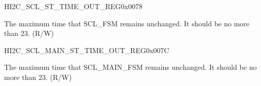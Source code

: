 \begin{register}{H}{I2C\_SCL\_ST\_TIME\_OUT\_REG}{0x0078}\label{regdesc:I2CSCLSTTIMEOUTREG}
%
%
\regnewline%
\begin{regdesc}\begin{reglist}
\label{fielddesc:I2CSCLSTTOI2C}\item [I2C\_SCL\_ST\_TO\_I2C] The maximum time that SCL\_FSM remains unchanged. It should be no more than 23. (R/W)
\end{reglist}\end{regdesc}
\end{register}


\begin{register}{H}{I2C\_SCL\_MAIN\_ST\_TIME\_OUT\_REG}{0x007C}\label{regdesc:I2CSCLMAINSTTIMEOUTREG}
%
%
\regnewline%
\begin{regdesc}\begin{reglist}
\label{fielddesc:I2CSCLMAINSTTOI2C}\item [I2C\_SCL\_MAIN\_ST\_TO\_I2C] The maximum time that SCL\_MAIN\_FSM remains unchanged. It should be no more than 23. (R/W)
\end{reglist}\end{regdesc}
\end{register}


